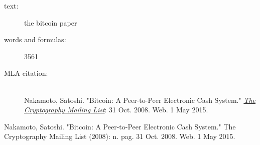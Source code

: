 \documentclass[a4paper,english,12pt]{article}
\begin{document}
 
\begin{description}
\item[text:] the bitcoin paper
\item[words and formulas:] 3561
\item[MLA citation:]\hfill \\ Nakamoto, Satoshi. "Bitcoin: A Peer-to-Peer Electronic Cash System." %
\href{http://www.metzdowd.com/mailman/listinfo/cryptography}{\emph{The Cryptography Mailing List}}: 31 Oct. 2008. Web. 1 May 2015.
\end{description}

Nakamoto, Satoshi. "Bitcoin: A Peer-to-Peer Electronic Cash System." The Cryptography Mailing List (2008): n. pag. 31 Oct. 2008. Web. 1 May 2015.

\end{document}
